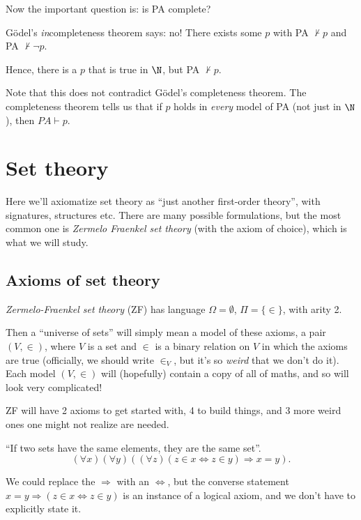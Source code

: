 \documentclass[a4paper]{article}
\begin{document}
Now the important question is: is PA complete?

G\"odel's \emph{in}completeness theorem says: no! There exists some $p$ with PA $\not\vdash p$ and PA $\not\vdash \neg p$.

Hence, there is a $p$ that is true in $\N$, but PA $\not\vdash p$.

Note that this does not contradict G\"odel's completeness theorem. The completeness theorem tells us that if $p$ holds in \emph{every} model of PA (not just in $\N$), then $PA\vdash p$.

\section{Set theory}
Here we'll axiomatize set theory as ``just another first-order theory'', with signatures, structures etc. There are many possible formulations, but the most common one is \emph{Zermelo Fraenkel set theory} (with the axiom of choice), which is what we will study.

\subsection{Axioms of set theory}
\begin{defi}
  \emph{Zermelo-Fraenkel set theory} (ZF) has language $\Omega = \emptyset$, $\Pi = \{\in\}$, with arity 2.
\end{defi}
Then a ``universe of sets'' will simply mean a model of these axioms, a pair $(V, \in)$, where $V$ is a set and $\in$ is a binary relation on $V$ in which the axioms are true (officially, we should write $\in_V$, but it's so \emph{weird} that we don't do it). Each model $(V, \in)$ will (hopefully) contain a copy of all of maths, and so will look very complicated!

ZF will have 2 axioms to get started with, 4 to build things, and 3 more weird ones one might not realize are needed.

\begin{axiom}
  ``If two sets have the same elements, they are the same set''.
  \[
    (\forall x)(\forall y)((\forall z)(z\in x\Leftrightarrow z\in y) \Rightarrow  x = y).
  \]
\end{axiom}
We could replace the $\Rightarrow $ with an $\Leftrightarrow$, but the converse statement $x = y \Rightarrow  (z\in x \Leftrightarrow z\in y)$ is an instance of a logical axiom, and we don't have to explicitly state it.
\end{document}
